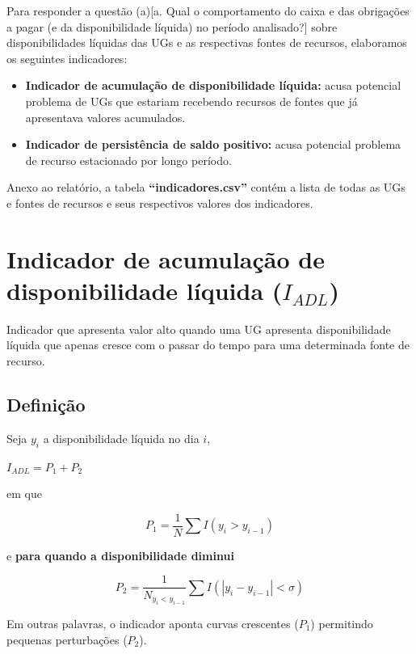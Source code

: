 \documentclass[
]{book}
\begin{document}
Para responder a questão (a){[}a. Qual o comportamento do caixa e das obrigações a pagar (e da disponibilidade líquida) no período analisado?{]} sobre disponibilidades líquidas das UGs e as respectivas fontes de recursos, elaboramos os seguintes indicadores:

\begin{itemize}
\item
  \textbf{Indicador de acumulação de disponibilidade líquida:} acusa potencial problema de UGs que estariam recebendo recursos de fontes que já apresentava valores acumulados.
\item
  \textbf{Indicador de persistência de saldo positivo:} acusa potencial problema de recurso estacionado por longo período.
\end{itemize}

Anexo ao relatório, a tabela \textbf{``indicadores.csv''} contém a lista de todas as UGs e fontes de recursos e seus respectivos valores dos indicadores.

\hypertarget{indicador-de-acumulauxe7uxe3o-de-disponibilidade-luxedquida-i_adl}{%
\section{\texorpdfstring{Indicador de acumulação de disponibilidade líquida (\(I_{ADL}\))}{Indicador de acumulação de disponibilidade líquida (I\_\{ADL\})}}\label{indicador-de-acumulauxe7uxe3o-de-disponibilidade-luxedquida-i_adl}}

Indicador que apresenta valor alto quando uma UG apresenta disponibilidade líquida que apenas cresce com o passar do tempo para uma determinada fonte de recurso.

\hypertarget{definiuxe7uxe3o}{%
\subsection{Definição}\label{definiuxe7uxe3o}}

Seja \(y_i\) a disponibilidade líquida no dia \(i\),

\(I_{ADL} = P_1 + P_2\)

em que

\[
P_1 = \frac{1}{N}\sum I(y_i > y_{i - 1})
\]

e \textbf{para quando a disponibilidade diminui}

\[
P_2 = \frac{1}{N_{y_i < y_{i - 1}}}\sum I(|y_i -y_{i - 1}| < \sigma)
\]

Em outras palavras, o indicador aponta curvas crescentes (\(P_1\)) permitindo pequenas perturbações (\(P_2\)).
\end{document}
